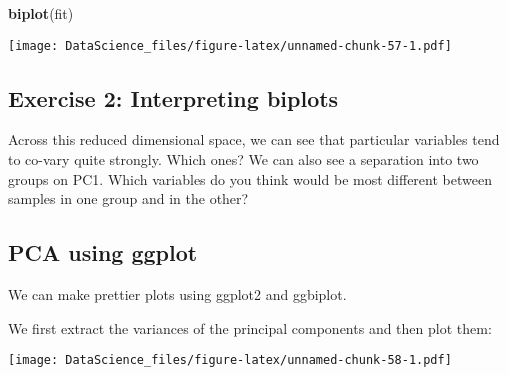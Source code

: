 \documentclass[
]{book}
\newenvironment{Shaded}{\begin{snugshade}}{\end{snugshade}}
\newcommand{\DataTypeTok}[1]{\textcolor[rgb]{0.13,0.29,0.53}{#1}}
\newcommand{\DecValTok}[1]{\textcolor[rgb]{0.00,0.00,0.81}{#1}}
\newcommand{\KeywordTok}[1]{\textcolor[rgb]{0.13,0.29,0.53}{\textbf{#1}}}
\newcommand{\NormalTok}[1]{#1}
\newcommand{\OperatorTok}[1]{\textcolor[rgb]{0.81,0.36,0.00}{\textbf{#1}}}
\newcommand{\StringTok}[1]{\textcolor[rgb]{0.31,0.60,0.02}{#1}}
\begin{document}
\begin{Shaded}
\begin{Highlighting}[]
\KeywordTok{biplot}\NormalTok{(fit)}
\end{Highlighting}
\end{Shaded}

\texttt{[image: DataScience\_files/figure-latex/unnamed-chunk-57-1.pdf]}

\hypertarget{exercise-2-interpreting-biplots}{%
\subsection{Exercise 2: Interpreting biplots}\label{exercise-2-interpreting-biplots}}

Across this reduced dimensional space, we can see that particular variables tend to co-vary quite strongly. Which ones? We can also see a separation into two groups on PC1. Which variables do you think would be most different between samples in one group and in the other?

\hypertarget{pca-using-ggplot}{%
\subsection{PCA using ggplot}\label{pca-using-ggplot}}

We can make prettier plots using ggplot2 and ggbiplot.

We first extract the variances of the principal components and then plot them:

\begin{Shaded}
\end{Shaded}

\texttt{[image: DataScience\_files/figure-latex/unnamed-chunk-58-1.pdf]}
\end{document}
